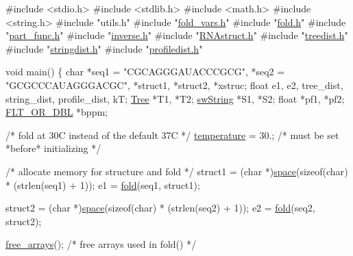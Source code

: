 \begin{DoxyCodeInclude}
\textcolor{preprocessor}{#include  <stdio.h>}
\textcolor{preprocessor}{#include  <stdlib.h>}
\textcolor{preprocessor}{#include  <math.h>}
\textcolor{preprocessor}{#include  <string.h>}
\textcolor{preprocessor}{#include  "utils.h"}
\textcolor{preprocessor}{#include  "\hyperlink{fold__vars_8h}{fold\_vars.h}"}
\textcolor{preprocessor}{#include  "\hyperlink{fold_8h}{fold.h}"}
\textcolor{preprocessor}{#include  "\hyperlink{part__func_8h}{part\_func.h}"}
\textcolor{preprocessor}{#include  "\hyperlink{inverse_8h}{inverse.h}"}
\textcolor{preprocessor}{#include  "\hyperlink{RNAstruct_8h}{RNAstruct.h}"}
\textcolor{preprocessor}{#include  "\hyperlink{treedist_8h}{treedist.h}"}
\textcolor{preprocessor}{#include  "\hyperlink{stringdist_8h}{stringdist.h}"}
\textcolor{preprocessor}{#include  "\hyperlink{profiledist_8h}{profiledist.h}"}

\textcolor{keywordtype}{void}
main()
\{
  \textcolor{keywordtype}{char}        *seq1 = \textcolor{stringliteral}{"CGCAGGGAUACCCGCG"}, *seq2 = \textcolor{stringliteral}{"GCGCCCAUAGGGACGC"},
              *struct1, *struct2, *xstruc;
  \textcolor{keywordtype}{float}       e1, e2, tree\_dist, string\_dist, profile\_dist, kT;
  \hyperlink{structTree}{Tree}        *T1, *T2;
  \hyperlink{structswString}{swString}    *S1, *S2;
  \textcolor{keywordtype}{float}       *pf1, *pf2;
  \hyperlink{group__data__structures_ga31125aeace516926bf7f251f759b6126}{FLT\_OR\_DBL}  *bppm;

  \textcolor{comment}{/* fold at 30C instead of the default 37C */}
  \hyperlink{group__model__details_gab4b11c8d9c758430960896bc3fe82ead}{temperature} = 30.;       \textcolor{comment}{/* must be set *before* initializing  */}

  \textcolor{comment}{/* allocate memory for structure and fold */}
  struct1 = (\textcolor{keywordtype}{char} *)\hyperlink{utils_2basic_8h_ad7e1e137b3bf1f7108933d302a7f0177}{space}(\textcolor{keyword}{sizeof}(\textcolor{keywordtype}{char}) * (strlen(seq1) + 1));
  e1      = \hyperlink{group__mfe__global__deprecated_gaadafcb0f140795ae62e5ca027e335a9b}{fold}(seq1, struct1);

  struct2 = (\textcolor{keywordtype}{char} *)\hyperlink{utils_2basic_8h_ad7e1e137b3bf1f7108933d302a7f0177}{space}(\textcolor{keyword}{sizeof}(\textcolor{keywordtype}{char}) * (strlen(seq2) + 1));
  e2      = \hyperlink{group__mfe__global__deprecated_gaadafcb0f140795ae62e5ca027e335a9b}{fold}(seq2, struct2);

  \hyperlink{group__mfe__global__deprecated_ga107fdfe5fd641868156bfd849f6866c7}{free\_arrays}();      \textcolor{comment}{/* free arrays used in fold() */}


\end{DoxyCodeInclude}
